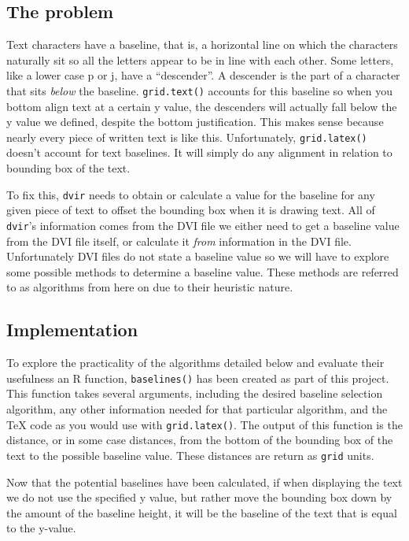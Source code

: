 \documentclass[]{article}
\begin{document}
\subsection{The problem}\label{the-problem}

Text characters have a baseline, that is, a horizontal line on which the
characters naturally sit so all the letters appear to be in line with
each other. Some letters, like a lower case p or j, have a
``descender''. A descender is the part of a character that sits
\emph{below} the baseline. \texttt{grid.text()} accounts for this
baseline so when you bottom align text at a certain y value, the
descenders will actually fall below the y value we defined, despite the
bottom justification. This makes sense because nearly every piece of
written text is like this. Unfortunately, \texttt{grid.latex()} doesn't
account for text baselines. It will simply do any alignment in relation
to bounding box of the text.

To fix this, \texttt{dvir} needs to obtain or calculate a value for the
baseline for any given piece of text to offset the bounding box when it
is drawing text. All of \texttt{dvir}'s information comes from the DVI
file we either need to get a baseline value from the DVI file itself, or
calculate it \emph{from} information in the DVI file. Unfortunately DVI
files do not state a baseline value so we will have to explore some
possible methods to determine a baseline value. These methods are
referred to as algorithms from here on due to their heuristic nature.

\subsection{Implementation}\label{implementation}

To explore the practicality of the algorithms detailed below and
evaluate their usefulness an R function, \texttt{baselines()} has been
created as part of this project. This function takes several arguments,
including the desired baseline selection algorithm, any other
information needed for that particular algorithm, and the \TeX{} code as
you would use with \texttt{grid.latex()}. The output of this function is
the distance, or in some case distances, from the bottom of the bounding
box of the text to the possible baseline value. These distances are
return as \texttt{grid} units.

Now that the potential baselines have been calculated, if when
displaying the text we do not use the specified y value, but rather move
the bounding box down by the amount of the baseline height, it will be
the baseline of the text that is equal to the y-value.
\end{document}

